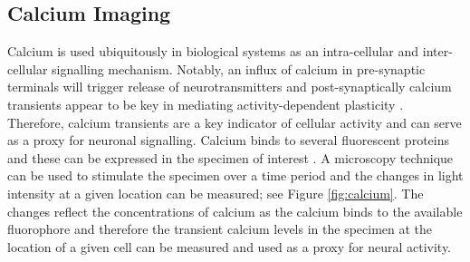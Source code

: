 \subsection{Calcium Imaging}
Calcium is used ubiquitously in biological systems as an intra-cellular and inter-cellular signalling mechanism. Notably, an influx of calcium in pre-synaptic terminals will trigger release of neurotransmitters and post-synaptically calcium transients appear to be key in mediating activity-dependent plasticity \cite{Grienberger2012-nr}. Therefore, calcium transients are a key indicator of cellular activity and can serve as a proxy for neuronal signalling. Calcium binds to several fluorescent proteins and these can be expressed in the specimen of interest  \cite{Grienberger2012-nr}. A microscopy technique can be used to stimulate the specimen over a time period and the changes in light intensity at a given location can be measured; see Figure \ref{fig:calcium}. The changes reflect the concentrations of calcium as the calcium binds to the available fluorophore and therefore the transient calcium levels in the specimen at the location of a given cell can be measured and used as a proxy for neural activity. 


